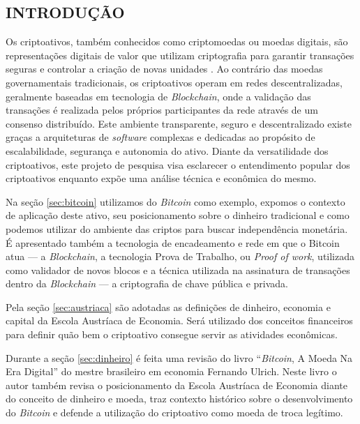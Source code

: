 \documentclass[article,12pt,oneside,a4paper,english,brazil]{unifil}
\begin{document}
\textual
\fontsize{12}{7}\selectfont
\begin{Spacing}{1.5}

% 

\section*{INTRODUÇÃO}

Os criptoativos, também conhecidos como criptomoedas ou moedas digitais, são representações digitais de valor que utilizam criptografia para garantir transações seguras e controlar a criação de novas unidades \cite{Yetmar2023}. Ao contrário das moedas governamentais tradicionais, os criptoativos operam em redes descentralizadas, geralmente baseadas em tecnologia de \textit{Blockchain}, onde a validação das transações é realizada pelos próprios participantes da rede através de um consenso distribuído. Este ambiente transparente, seguro e descentralizado existe graças a arquiteturas de \textit{software} complexas e dedicadas ao propósito de escalabilidade, segurança e autonomia do ativo. Diante da versatilidade dos criptoativos, este projeto de pesquisa visa esclarecer o entendimento popular dos criptoativos enquanto expõe uma análise técnica e econômica do mesmo.

Na seção \ref*{sec:bitcoin} utilizamos do \textit{Bitcoin} como exemplo, expomos o contexto de aplicação deste ativo, seu posicionamento sobre o dinheiro tradicional e como podemos utilizar do ambiente das criptos para buscar independência monetária. É apresentado também a tecnologia de encadeamento e rede em que o Bitcoin atua — a \textit{Blockchain}, a tecnologia Prova de Trabalho, ou \textit{Proof of work}, utilizada como validador de novos blocos e a técnica utilizada na assinatura de transações dentro da \textit{Blockchain} — a criptografia de chave pública e privada.

Pela seção \ref*{sec:austriaca} são adotadas as definições de dinheiro, economia e capital da Escola Austríaca de Economia. Será utilizado dos conceitos financeiros para definir quão bem o criptoativo consegue servir as atividades econômicas.

Durante a seção \ref*{sec:dinheiro} é feita uma revisão do livro ``\textit{Bitcoin}, A Moeda Na Era Digital'' do mestre brasileiro em economia Fernando Ulrich. Neste livro o autor também revisa o posicionamento da Escola Austríaca de Economia diante do conceito de dinheiro e moeda, traz contexto histórico sobre o desenvolvimento do \textit{Bitcoin} e defende a utilização do criptoativo como moeda de troca legítimo.



\end{Spacing}
\end{document}
